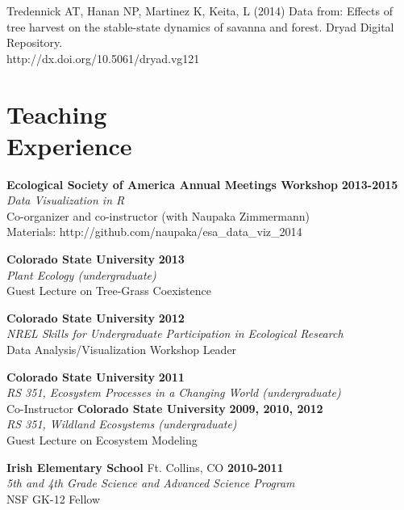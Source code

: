 \documentclass[margin,line]{resume}
\begin{document}
\begin{resume}
    Tredennick AT, Hanan NP, Martinez K, Keita, L (2014) Data from: Effects of tree harvest on the stable-state dynamics of savanna and forest. Dryad Digital Repository. \\ http://dx.doi.org/10.5061/dryad.vg121
    
    \section{\mysidestyle Teaching\\Experience}
    \textbf{Ecological Society of America Annual Meetings Workshop} \hfill \textbf{2013-2015}\\
    		\textsl{Data Visualization in R}\\
		Co-organizer and co-instructor (with Naupaka Zimmermann)\\
		Materials: http://github.com/naupaka/esa\_data\_viz\_2014
    
    \textbf{Colorado State University} \hfill \textbf{2013}\\
               \textsl{Plant Ecology (undergraduate)}\\
               Guest Lecture on Tree-Grass Coexistence
               
    \textbf{Colorado State University} \hfill \textbf{2012}\\ 
               \textsl{NREL Skills for Undergraduate Participation in Ecological Research}\\
               Data Analysis/Visualization Workshop Leader
               
    \textbf{Colorado State University} \hfill \textbf{2011}\\ 
               \textsl{RS 351, Ecosystem Processes in a Changing World (undergraduate)}\\
               Co-Instructor 
                \newpage{}
    \textbf{Colorado State University} \hfill \textbf{2009, 2010, 2012}\\ 
               \textsl{RS 351, Wildland Ecosystems (undergraduate)}\\
               Guest Lecture on Ecosystem Modeling
               
    \textbf{Irish Elementary School} Ft. Collins, CO \hfill \textbf{2010-2011}\\ 
   		\textsl{5th and 4th Grade Science and Advanced Science Program}\\
		NSF GK-12 Fellow
		

\end{resume}
\end{document}
